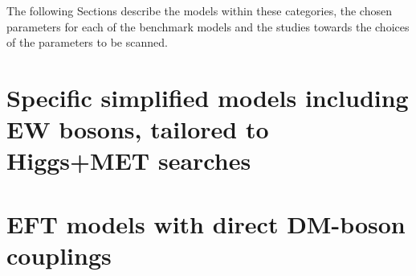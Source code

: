 The following Sections describe the models within these categories,
the chosen parameters for each of the benchmark models
and the studies towards the choices of the parameters to be scanned.

\section{Specific simplified models including EW bosons, tailored to Higgs+MET searches}
\label{sec:monoHiggs}


\section{EFT models with direct DM-boson couplings}
\label{sec:EFT_models_with_direct_DM_boson_couplings}

